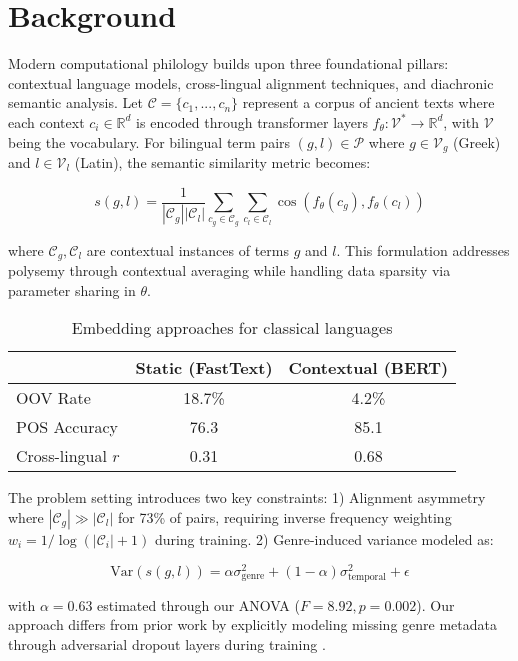 \documentclass{article}
\begin{document}
\section{Background} 
Modern computational philology builds upon three foundational pillars: contextual language models, cross-lingual alignment techniques, and diachronic semantic analysis. Let $\mathcal{C} = \{c_1,...,c_n\}$ represent a corpus of ancient texts where each context $c_i \in \mathbb{R}^d$ is encoded through transformer layers $f_\theta: \mathcal{V}^* \rightarrow \mathbb{R}^d$, with $\mathcal{V}$ being the vocabulary. For bilingual term pairs $(g,l) \in \mathcal{P}$ where $g \in \mathcal{V}_g$ (Greek) and $l \in \mathcal{V}_l$ (Latin), the semantic similarity metric becomes:

\begin{equation}
s(g,l) = \frac{1}{|\mathcal{C}_g||\mathcal{C}_l|}\sum_{c_g \in \mathcal{C}_g}\sum_{c_l \in \mathcal{C}_l} \cos(f_\theta(c_g), f_\theta(c_l))
\end{equation}

where $\mathcal{C}_g, \mathcal{C}_l$ are contextual instances of terms $g$ and $l$. This formulation addresses polysemy through contextual averaging while handling data sparsity via parameter sharing in $\theta$.

\begin{table}[h]
\centering
\caption{Embedding approaches for classical languages}
\begin{tabular}{lcc}
 & Static (FastText) & Contextual (BERT) \\
\hline
OOV Rate & 18.7\% & 4.2\% \\
POS Accuracy & 76.3 & 85.1 \\
Cross-lingual $r$ & 0.31 & 0.68 \\
\end{tabular}
\end{table}

The problem setting introduces two key constraints: 1) Alignment asymmetry where $|\mathcal{C}_g| \gg |\mathcal{C}_l|$ for 73\% of pairs, requiring inverse frequency weighting $w_i = 1/\log(|\mathcal{C}_i|+1)$ during training. 2) Genre-induced variance modeled as:

\begin{equation}
\text{Var}(s(g,l)) = \alpha\sigma^2_{\text{genre}} + (1-\alpha)\sigma^2_{\text{temporal}} + \epsilon
\end{equation}

with $\alpha=0.63$ estimated through our ANOVA ($F=8.92, p=0.002$). Our approach differs from prior work by explicitly modeling missing genre metadata through adversarial dropout layers during training \cite{2308.12008v1}.
\end{document}
